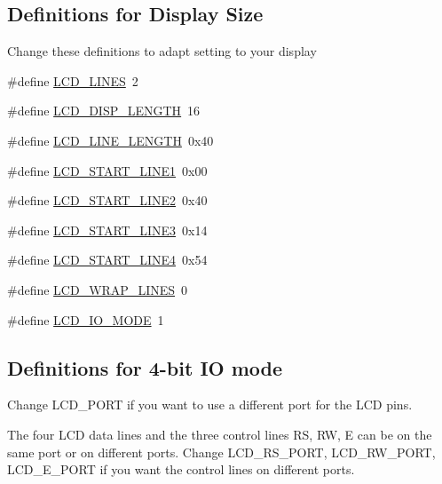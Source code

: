 \subsection*{Definitions for Display Size}
\label{_amgrpcaec0cb1262819d89ffa7f25526cc869}%
Change these definitions to adapt setting to your display \begin{DoxyCompactItemize}
\item 
\#define \hyperlink{group__pfleury__lcd_ga01212e90283511562039db786f65ba98}{L\+C\+D\+\_\+\+L\+I\+N\+ES}~2
\item 
\#define \hyperlink{group__pfleury__lcd_ga684bb4392e384b7ae7c660d81dacb930}{L\+C\+D\+\_\+\+D\+I\+S\+P\+\_\+\+L\+E\+N\+G\+TH}~16
\item 
\#define \hyperlink{group__pfleury__lcd_gae59a728d9dee9f12c817b29d38746ed9}{L\+C\+D\+\_\+\+L\+I\+N\+E\+\_\+\+L\+E\+N\+G\+TH}~0x40
\item 
\#define \hyperlink{group__pfleury__lcd_gabd056d70a1488ea2eb1aef87e248e234}{L\+C\+D\+\_\+\+S\+T\+A\+R\+T\+\_\+\+L\+I\+N\+E1}~0x00
\item 
\#define \hyperlink{group__pfleury__lcd_ga7b317b21058ef031716ba040ef75430a}{L\+C\+D\+\_\+\+S\+T\+A\+R\+T\+\_\+\+L\+I\+N\+E2}~0x40
\item 
\#define \hyperlink{group__pfleury__lcd_gae7cca16353048a062baeb3a52da55249}{L\+C\+D\+\_\+\+S\+T\+A\+R\+T\+\_\+\+L\+I\+N\+E3}~0x14
\item 
\#define \hyperlink{group__pfleury__lcd_gab1b73e05bdb5cc12cdff5a1cf6c4f2a2}{L\+C\+D\+\_\+\+S\+T\+A\+R\+T\+\_\+\+L\+I\+N\+E4}~0x54
\item 
\#define \hyperlink{group__pfleury__lcd_gadb35ff6cb242e48ba0545ea919ffc5d3}{L\+C\+D\+\_\+\+W\+R\+A\+P\+\_\+\+L\+I\+N\+ES}~0
\item 
\#define \hyperlink{group__pfleury__lcd_ga659fcdf979f69bbd14f852f525f25e02}{L\+C\+D\+\_\+\+I\+O\+\_\+\+M\+O\+DE}~1
\end{DoxyCompactItemize}
\subsection*{Definitions for 4-\/bit IO mode}
\label{_amgrp0d38ed8c5b4202f593f69f9003c1a16c}%
Change L\+C\+D\+\_\+\+P\+O\+RT if you want to use a different port for the L\+CD pins.

The four L\+CD data lines and the three control lines RS, RW, E can be on the same port or on different ports. Change L\+C\+D\+\_\+\+R\+S\+\_\+\+P\+O\+RT, L\+C\+D\+\_\+\+R\+W\+\_\+\+P\+O\+RT, L\+C\+D\+\_\+\+E\+\_\+\+P\+O\+RT if you want the control lines on different ports.


